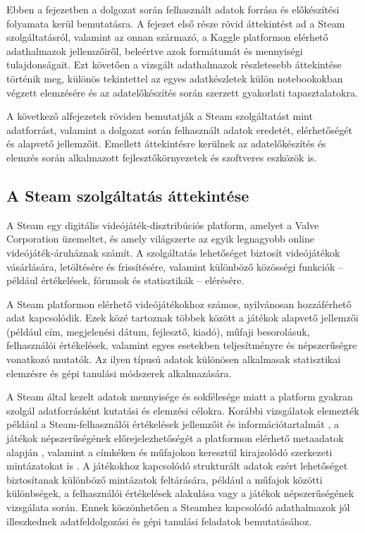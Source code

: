 
Ebben a fejezetben a dolgozat során felhasznált adatok forrása és előkészítési folyamata kerül bemutatásra. A fejezet első része rövid áttekintést ad a Steam \cite{steam} szolgáltatásról, valamint az onnan származó, a Kaggle \cite{kaggle} platformon elérhető adathalmazok jellemzőiről, beleértve azok formátumát és mennyiségi tulajdonságait. Ezt követően a vizsgált adathalmazok részletesebb áttekintése történik meg, különös tekintettel az egyes adatkészletek külön notebookokban végzett elemzésére és az adatelőkészítés során szerzett gyakorlati tapasztalatokra.


A következő alfejezetek röviden bemutatják a Steam \cite{steam} szolgáltatást mint
adatforrást, valamint a dolgozat során felhasznált adatok eredetét,
elérhetőségét és alapvető jellemzőit. Emellett áttekintésre kerülnek az
adatelőkészítés és elemzés során alkalmazott fejlesztőkörnyezetek és
szoftveres eszközök is.

\subsection{A Steam szolgáltatás áttekintése}

A Steam \cite{steam} egy digitális videójáték-disztribúciós platform, amelyet a Valve Corporation \cite{valve} üzemeltet, és amely világszerte az egyik legnagyobb online videójáték-áruháznak számít. A szolgáltatás lehetőséget biztosít videójátékok vásárlására, letöltésére és frissítésére, valamint különböző közösségi funkciók – például értékelések, fórumok és statisztikák – elérésére.

A Steam platformon elérhető videójátékokhoz számos, nyilvánosan hozzáférhető adat kapcsolódik. Ezek közé tartoznak többek között a játékok alapvető jellemzői (például cím, megjelenési dátum, fejlesztő, kiadó), műfaji besorolásuk, felhasználói értékelések, valamint egyes esetekben teljesítményre és népszerűségre vonatkozó mutatók. Az ilyen típusú adatok különösen alkalmasak statisztikai elemzésre és gépi tanulási módszerek alkalmazására.

A Steam által kezelt adatok mennyisége és sokfélesége miatt a platform gyakran szolgál adatforrásként kutatási és elemzési célokra. Korábbi vizsgálatok elemezték például a Steam-felhasználói értékelések jellemzőit és információtartalmát \cite{Lin2019SteamReviews}, a játékok népszerűségének előrejelezhetőségét a platformon elérhető metaadatok alapján  \cite{DeLuisa2021SteamPopularity}, valamint a címkéken és műfajokon keresztül kirajzolódó szerkezeti mintázatokat is \cite{Rizani2020SteamTags}. A játékokhoz kapcsolódó strukturált adatok ezért lehetőséget biztosítanak különböző mintázatok feltárására, például a műfajok közötti különbségek, a felhasználói értékelések alakulása vagy a játékok népszerűségének vizsgálata során. Ennek köszönhetően a Steamhez kapcsolódó adathalmazok jól illeszkednek adatfeldolgozási és gépi tanulási feladatok bemutatásához.

